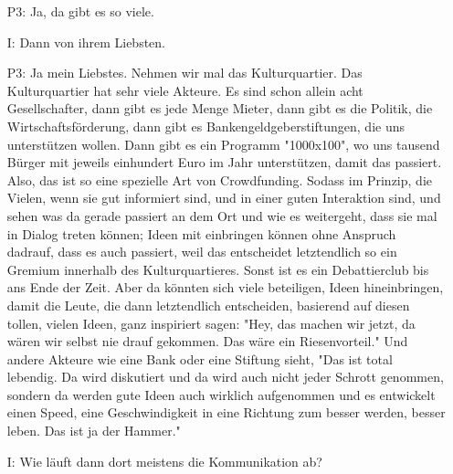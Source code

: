 \begin{itemize}
    \item[P3:] Ja, da gibt es so viele.
    \item[I:] Dann von ihrem Liebsten.
    \item[P3:] Ja mein Liebstes. Nehmen wir mal das Kulturquartier. Das Kulturquartier hat sehr viele Akteure. Es sind schon allein acht Gesellschafter, dann gibt es jede Menge Mieter, dann gibt es die Politik, die Wirtschaftsf{\"o}rderung, dann gibt es Bankengeldgeberstiftungen, die uns unterst{\"u}tzen wollen. Dann gibt es ein Programm "1000x100", wo uns tausend B{\"u}rger mit jeweils einhundert Euro im Jahr unterst{\"u}tzen, damit das passiert. Also, das ist so eine spezielle Art von Crowdfunding. Sodass im Prinzip, die Vielen, wenn sie gut informiert sind, und in einer guten Interaktion sind, und sehen was da gerade passiert an dem Ort und wie es weitergeht, dass sie mal in Dialog treten k{\"o}nnen; Ideen mit einbringen k{\"o}nnen ohne Anspruch dadrauf, dass es auch passiert, weil das entscheidet letztendlich so ein Gremium innerhalb des Kulturquartieres. Sonst ist es ein Debattierclub bis ans Ende der Zeit. Aber da k{\"o}nnten sich viele beteiligen, Ideen hineinbringen, damit die Leute, die dann letztendlich entscheiden, basierend auf diesen tollen, vielen Ideen, ganz inspiriert sagen: "Hey, das machen wir jetzt, da w{\"a}ren wir selbst nie drauf gekommen. Das w{\"a}re ein Riesenvorteil." Und andere Akteure wie eine Bank oder eine Stiftung sieht, "Das ist total lebendig. Da wird diskutiert und da wird auch nicht jeder Schrott genommen, sondern da werden gute Ideen auch wirklich aufgenommen und es entwickelt einen Speed, eine Geschwindigkeit in eine Richtung zum besser werden, besser leben. Das ist ja der Hammer."
    \item[I:] Wie l{\"a}uft dann dort meistens die Kommunikation ab?

\end{itemize}
